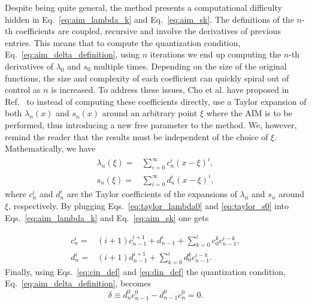 Despite being quite general, the method presents a computational difficulty hidden in Eq.~\eqref{eq:aim_lambda_k} and Eq.~\eqref{eq:aim_sk}. The definitions of the $n$-th coefficients are coupled, recursive and involve the derivatives of previous entries. This means that to compute the quantization condition, Eq.~\eqref{eq:aim_delta_definition}, using $n$ iterations we end up computing the $n$-th derivatives of $\lambda_0$ and $s_0$ multiple times. Depending on the size of the original functions, the size and complexity of each coefficient can quickly spiral out of control as $n$ is increased. To address these issues, Cho et al. have proposed in Ref.~\cite{aim_improved} to instead of computing these coefficients directly, use a Taylor expansion of both $\lambda_n(x)$ and $s_n(x)$ around an arbitrary point $\xi$ where the AIM is to be performed, thus introducing a new free parameter to the method. We, however, remind the reader that the results must be independent of the choice of $\xi$. Mathematically, we have
%
\begin{align}
  \lambda_n(\xi) = & \sum_{i=0}^{\infty}c^{i}_n(x - \xi)^i, \label{eq:taylor_lambda0} \\
  s_n(\xi) =       & \sum_{i=0}^{\infty}d^{i}_n(x - \xi)^i, \label{eq:taylor_s0}
\end{align}
%
where $c^i_n$ and $d^i_n$ are the Taylor coefficients of the expansions of $\lambda_n$ and $s_n$ around $\xi$, respectively. By plugging Eqs.~\eqref{eq:taylor_lambda0} and \eqref{eq:taylor_s0} into Eqs.~\eqref{eq:aim_lambda_k} and Eq.~\eqref{eq:aim_sk} one gets

\begin{align}
  c^i_n = & (i+1)c^{i+1}_{n-1} + d^i_{n-1} + \sum_{k=0}^{i}c^k_0c^{i-k}_{n-1}, \label{eq:cin_def} \\
  d^i_n = & (i+1)d^{i+1}_{n-1} + \sum_{k=0}^{i}d^k_0c^{i-k}_{n-1}. \label{eq:din_def}
\end{align}
%
Finally, using Eqs.~\eqref{eq:cin_def} and \eqref{eq:din_def} the quantization condition, Eq.~\eqref{eq:aim_delta_definition}, becomes
%
\begin{equation}
  \delta \equiv d^0_n c^0_{n-1} - d^0_{n-1}c^0_n = 0.
  \label{eq:improved_delta}
\end{equation}

